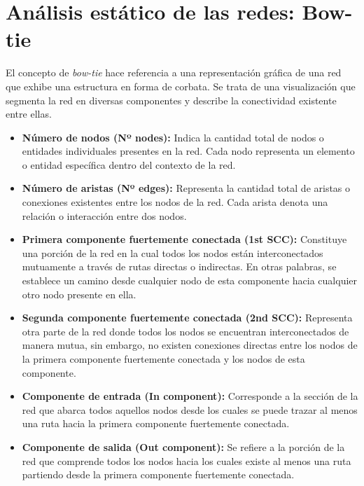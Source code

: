 
\section{Análisis estático de las redes: Bow-tie}

El concepto de \textit{bow-tie} \cite{enwiki:1148363387} hace referencia a una representación gráfica de una red
que exhibe una estructura en forma de corbata. Se trata de una visualización que segmenta
la red en diversas componentes y describe la conectividad existente entre ellas.

\begin{itemize}
    \item \textbf{Número de nodos (Nº nodes):} Indica la cantidad total de nodos o entidades individuales presentes en la red. Cada nodo representa un elemento o entidad específica dentro del contexto de la red.

    \item \textbf{Número de aristas (Nº edges):} Representa la cantidad total de aristas o conexiones existentes entre los nodos de la red. Cada arista denota una relación o interacción entre dos nodos.

    \item \textbf{Primera componente fuertemente conectada (1st SCC):} Constituye una porción de la red en la cual todos los nodos están interconectados mutuamente a través de rutas directas o indirectas. En otras palabras, se establece un camino desde cualquier nodo de esta componente hacia cualquier otro nodo presente en ella.

    \item \textbf{Segunda componente fuertemente conectada (2nd SCC):} Representa otra parte de la red donde todos los nodos se encuentran interconectados de manera mutua, sin embargo, no existen conexiones directas entre los nodos de la primera componente fuertemente conectada y los nodos de esta componente.

    \item \textbf{Componente de entrada (In component):} Corresponde a la sección de la red que abarca todos aquellos nodos desde los cuales se puede trazar al menos una ruta hacia la primera componente fuertemente conectada.

    \item \textbf{Componente de salida (Out component):} Se refiere a la porción de la red que comprende todos los nodos hacia los cuales existe al menos una ruta partiendo desde la primera componente fuertemente conectada.


\end{itemize}
